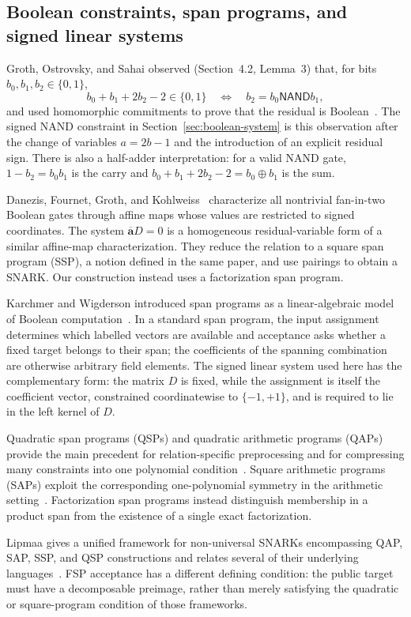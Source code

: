 \documentclass[11pt]{article}
\theoremstyle{definition}
\newcommand{\NAND}{\mathsf{NAND}}
\begin{document}
\subsection{Boolean constraints, span programs, and signed linear systems}

Groth, Ostrovsky, and Sahai observed (Section~4.2, Lemma~3) that, for bits
$b_0,b_1,b_2\in\{0,1\}$,
\[
  b_0+b_1+2b_2-2\in\{0,1\}
  \quad\Longleftrightarrow\quad
  b_2=b_0\mathbin{\NAND}b_1,
\]
and used homomorphic commitments to prove that the residual is
Boolean~\cite{GOS06}.
The signed NAND constraint in Section~\ref{sec:boolean-system} is this
observation after the change
of variables $a=2b-1$ and the introduction of an explicit residual sign.
There is also a half-adder interpretation: for a valid NAND gate,
$1-b_2=b_0b_1$ is the carry and
$b_0+b_1+2b_2-2=b_0\oplus b_1$ is the sum.

Danezis, Fournet, Groth, and Kohlweiss~\cite{DFGK14} characterize all
nontrivial fan-in-two Boolean gates through affine maps whose values are
restricted to signed coordinates.  The system $\overline{\mathbf a}D=0$ is a
homogeneous residual-variable form of a similar affine-map characterization.
They reduce the relation to a square span program (SSP), a notion defined in the
same paper, and use pairings to obtain a SNARK.  Our construction instead uses
a factorization span program.

Karchmer and Wigderson introduced span programs as a linear-algebraic model of
Boolean computation~\cite{KW93}.  In a standard span program, the input
assignment determines which labelled vectors are available and acceptance asks
whether a fixed target belongs to their span; the coefficients of the spanning
combination are otherwise arbitrary field elements.  The signed linear system
used here has the complementary form: the matrix $D$ is fixed, while the
assignment is itself the coefficient vector, constrained coordinatewise to
$\{-1,+1\}$, and is required to lie in the left kernel of $D$.

Quadratic span programs (QSPs) and quadratic arithmetic programs (QAPs) provide the main
precedent for relation-specific preprocessing and for compressing many
constraints into one polynomial condition~\cite{GGPR13}.  Square arithmetic
programs (SAPs) exploit the corresponding one-polynomial symmetry in the arithmetic
setting~\cite{GM17}.  Factorization span programs instead distinguish
membership in a product span from the existence of a single exact
factorization.

Lipmaa gives a unified framework for non-universal SNARKs encompassing QAP,
SAP, SSP, and QSP constructions and relates several of their underlying
languages~\cite{Lipmaa22}.  FSP acceptance has a different defining
condition: the public target must have a decomposable preimage, rather than
merely satisfying the quadratic or square-program condition of those
frameworks.
\end{document}
